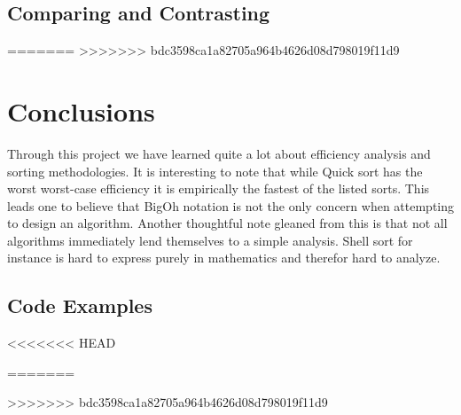\documentclass{article}
\begin{document}
   \subsection{Comparing and Contrasting}
=======
>>>>>>> bdc3598ca1a82705a964b4626d08d798019f11d9
\section{Conclusions}
Through this project we have learned quite a lot about efficiency analysis and
sorting methodologies. It is interesting to note that while Quick sort has the
worst worst-case efficiency it is empirically the fastest of the listed sorts.
This leads one to believe that BigOh notation is not the only concern when
attempting to design an algorithm. Another thoughtful note gleaned from this
is that not all algorithms immediately lend themselves to a simple analysis.
Shell sort for instance is hard to express purely in mathematics and therefor
hard to analyze.

\begin{appendices}
\section{Code Examples}



\lstset{
    language=Java
}
<<<<<<< HEAD


=======

>>>>>>> bdc3598ca1a82705a964b4626d08d798019f11d9
\end{appendices}



\end{document}
